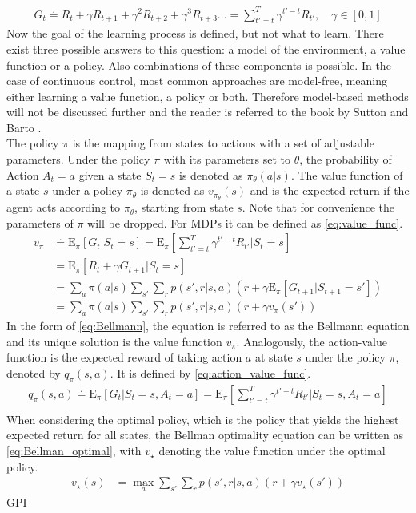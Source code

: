 \begin{align}
	G_t \doteq R_t + \gamma R_{t+1} + \gamma^2 R_{t+2} + \gamma^3 R_{t+3}... = \sum_{t'=t}^{T}\gamma^{t'-t} R_{t'},\quad \gamma \in [0, 1] \label{eq:return}
\end{align}
Now the goal of the learning process is defined, but not what to learn. There exist three possible answers to this question: a model of the environment, a value function or a policy. Also combinations of these components is possible. In the case of continuous control, most common approaches are model-free, meaning either learning a value function, a policy or both. Therefore model-based methods will not be discussed further and the reader is referred to the book by Sutton and Barto \cite{sutton_reinforcement_2018}. \\
The policy $\pi$ is the mapping from states to actions with a set of adjustable parameters. Under the policy $\pi$ with its parameters set to $\theta$, the probability of Action $A_t=a$ given a state $S_t=s$ is denoted as $\pi_\theta(a|s)$. The value function of a state $s$ under a policy $\pi_\theta$ is denoted as $v_{\pi_\theta}(s)$ and is the expected return if the agent acts according to $\pi_\theta$, starting from state $s$. Note that for convenience the parameters of $\pi$ will be dropped. For MDPs it can be defined as \eqref{eq:value_func}. 
\begin{align}
	v_{\pi} &\doteq \mathrm{E}_\pi \left[ G_t \vert S_t=s \right] =
	\mathrm{E}_\pi \left[\sum_{t'=t}^{T}\gamma^{t'-t} R_{t'} \vert S_t=s\right] \label{eq:value_func} \\
	&= \mathrm{E}_\pi \left[ R_t + \gamma G_{t+1} \vert S_t = s\right] \\
	&= \sum_{a} \pi(a \vert s) 
	\sum_{s'} \sum_{r} p(s',r \vert s,a) \left( r + \gamma \mathrm{E}_\pi \left[ G_{t+1} \vert S_{t+1} = s' \right] \right) \\
	&= \sum_{a} \pi(a \vert s) 
	\sum_{s'} \sum_{r} p(s',r \vert s,a) \left( r + \gamma v_\pi(s') \right) \label{eq:Bellmann}
\end{align}
In the form of \eqref{eq:Bellmann}, the equation is referred to as the Bellmann equation and its unique solution is the value function $v_\pi$. Analogously, the action-value function is the expected reward of taking action $a$ at state $s$ under the policy $\pi$, denoted by $q_\pi(s,a)$. It is defined by \eqref{eq:action_value_func}.
\begin{align}
	q_\pi(s,a) \doteq \mathrm{E}_\pi \left[ G_t \vert S_t=s, A_t=a \right] =
	\mathrm{E}_\pi \left[\sum_{t'=t}^{T}\gamma^{t'-t} R_{t'} \vert S_t=s, A_t=a\right] \label{eq:action_value_func} \\
\end{align}
 When considering the optimal policy, which is the policy that yields the highest expected return for all states, the Bellman optimality equation can be written as \eqref{eq:Bellman_optimal}, with $v_\star$ denoting the value function under the optimal policy.
\begin{align}
	v_\star(s) &= \max_a \sum_{s'} \sum_{r} p(s', r \vert s,a)\left(r + \gamma v_\star(s')\right) \label{eq:Bellman_optimal}
\end{align}
GPI 
